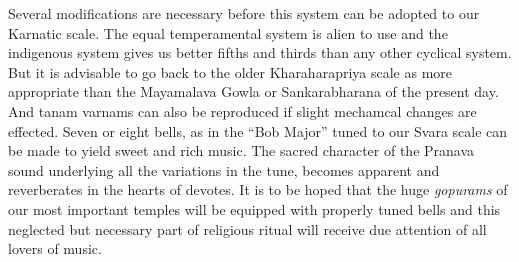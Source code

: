 \documentclass{book}
\begin{document}
Several modifications are necessary before this system can be adopted
to our Karnatic scale. The equal temperamental system is alien to use
and the indigenous system gives us better fifths and thirds than any
other cyclical system. But it is advisable to go back to the older
Kharaharapriya scale as more appropriate than the Mayamalava Gowla or
Sankarabharana of the present day. And tanam varnams can also be
reproduced if slight mechamcal changes are effected. Seven or eight
bells, as in the ``Bob Major'' tuned to our Svara scale can be made to
yield sweet and rich music. The sacred character of the Pranava sound
underlying all the variations in the tune, becomes apparent and
reverberates in the hearts of devotes. It is to be hoped that the huge
\textit{gopurams} of our most important temples will be equipped with
properly tuned bells and this neglected but necessary part of
religious ritual will receive due attention of all lovers of music.
\end{document}
